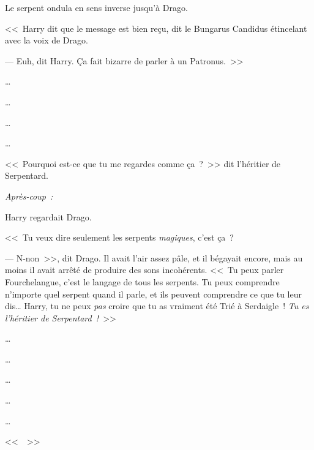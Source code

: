 Le serpent ondula en sens inverse jusqu'à Drago.

<<~Harry dit que le message est bien reçu, dit le Bungarus Candidus étincelant avec la voix de Drago.

--- Euh, dit Harry. Ça fait bizarre de parler à un Patronus.~>>

…

…

…

…

<<~Pourquoi est-ce que tu me regardes comme ça~?~>> dit l'héritier de Serpentard.

\later

\emph{Après-coup~:}

Harry regardait Drago.

<<~Tu veux dire seulement les serpents \emph{magiques}, c'est ça~?

--- N-non~>>, dit Drago. Il avait l'air assez pâle, et il bégayait encore, mais au moins il avait arrêté de produire des sons incohérents. <<~Tu peux parler Fourchelangue, c'est le langage de tous les serpents. Tu peux comprendre n'importe quel serpent quand il parle, et ils peuvent comprendre ce que tu leur dis… Harry, tu ne peux \emph{pas} croire que tu as vraiment été Trié à Serdaigle~! \emph{Tu es l'héritier de Serpentard~!}~>>

…

…

…

…

…

<<~~>>
